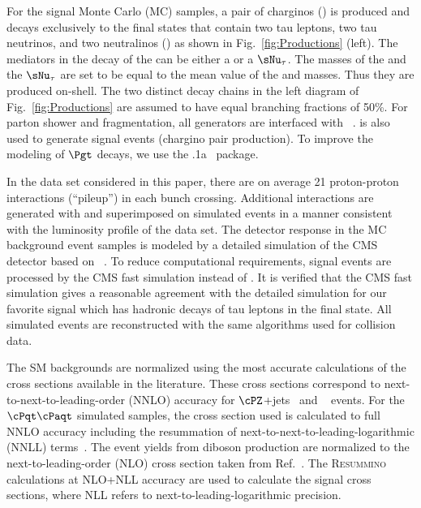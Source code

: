 For the signal Monte Carlo (MC) samples, a pair of charginos (\chione) 
is produced and decays exclusively to the final states that contain two tau leptons, two tau neutrinos, and %
two neutralinos (\PSGczDo) as shown in Fig.~\ref{fig:Productions} (left). 
The mediators in the decay of the \chione can be either a \sTau or a $\sNu_{\tau}$. 
The masses of the \sTau and the $\sNu_{\tau}$ are set to be equal to the mean value of the \chione and \PSGczDo masses. 
Thus they are produced on-shell.
The two distinct decay chains in the left diagram of Fig.~\ref{fig:Productions} 
are assumed to have equal branching fractions of 50\%. 
For parton shower and fragmentation, all generators are interfaced with ~\cite{Sjostrand:2006za}.
\PYTHIA is also used to generate signal events (chargino pair production). To improve the modeling of $\Pgt$ decays, 
we use the .1a~\cite{Davidson:2010rw} package. 


In the data set considered in this paper,
there are on average 21 proton-proton interactions (``pileup'') in each bunch crossing.
Additional interactions are generated with \PYTHIA and superimposed on simulated events in a manner consistent with the
luminosity profile of the data set.
The detector response in the MC background event samples is modeled by a
detailed simulation
of the CMS detector based on {\GEANTfour}~\cite{Agostinelli:2002hh}.  
To reduce  computational requirements, signal events 
are processed by the CMS fast simulation \cite{Abdullin:2011zz} instead of {\GEANTfour}. 
It is verified that the CMS fast simulation gives a reasonable agreement with the detailed simulation for our favorite signal which has hadronic decays of 
tau leptons in the final state.
All simulated events are reconstructed with the same algorithms used for collision data.

The SM backgrounds are normalized using the most accurate calculations of the cross sections available 
in the literature. These cross sections correspond to next-to-next-to-leading-order (NNLO) accuracy for $\cPZ$+jets~\cite{Melnikov:2006kv} 
and \wjets~\cite{xsec_WZ} events. For the $\cPqt\cPaqt$ simulated samples, the cross section used is calculated to full NNLO accuracy including
the resummation of next-to-next-to-leading-logarithmic (NNLL) terms~\cite{Czakon:2011xx}. %
The event yields from diboson production are normalized to the next-to-leading-order (NLO) cross section  taken from Ref.~\cite{Campbell:2011bn}. 
The \textsc{Resummino}~\cite{Fuks:2012qx,Fuks:2013vua,Fuks:2013lya} calculations at NLO+NLL accuracy are used to calculate the signal cross sections, where 
NLL refers to next-to-leading-logarithmic precision.
